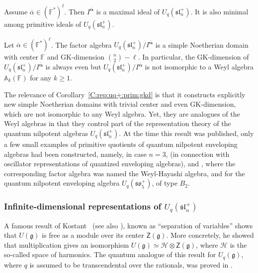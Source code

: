 \documentclass{commat}
\newcommand{\FF}{\mathbb{F}}
\newcommand{\wa}[1][1]{\mathbb{A}_{#1}}
\newcommand\ot{\otimes}
\newcommand{\barr}[1]{\overline{#1}}
\newcommand{\g}{\mathfrak g}
\newcommand{\fsl}{\mathfrak{sl}}
\begin{document}
\begin{theorem}[{\cite[Thm.\ 3.5]{sL06}}]\label{T:rep:uq+:prim:mt}
	Assume $\barr \alpha\in(\FF^{*})^{\ell}$. Then $I^{\mathbf{\barr\alpha}}$ is a maximal ideal of $U_q(\fsl_n^+)$. It is also minimal among primitive ideals of $U_q(\fsl_n^+)$.
\end{theorem}



\begin{corollary}[{\cite[Cor.\ 3.6]{sL06}}]\label{C:rep:uq+:prim:gkd}
	Let $\barr \alpha\in(\FF^{*})^{\ell}$. The factor algebra $U_q(\fsl_n^+)/I^{\mathbf{\barr\alpha}}$ is a simple Noetherian domain with center $\FF$ and GK-dimension $\binom{n}{2}-\ell$. In particular, the GK-dimension of $U_q(\fsl_n^+)/I^{\mathbf{\barr\alpha}}$ is always even but $U_q(\fsl_n^+)/I^{\mathbf{\barr\alpha}}$ is not isomorphic to a Weyl algebra $\wa[k](\FF)$ for any $k\geq 1$.
\end{corollary}

The relevance of Corollary~\ref{C:rep:uq+:prim:gkd} is that it constructs explicitly new simple Noetherian domains with trivial center and even GK-dimension, which are not isomorphic to any Weyl algebra. Yet, they are analogues of the Weyl algebras in that they control part of the representation theory of the quantum nilpotent algebras $U_q(\fsl_n^+)$. At the time this result was published, only a few small examples of primitive quotients of quantum nilpotent enveloping algebras had been constructed, namely, in case $n=3$, \cite{tH90} (in connection with oscillator representations of quantized enveloping algebras), \cite{KS93} and \cite{mpM94}, where the corresponding factor algebra was named the Weyl-Hayashi algebra, and \cite{sL07} for the quantum nilpotent enveloping algebra $U_q(\mathfrak{so}_5^+)$, of type $B_2$.



\subsubsection{Infinite-dimensional representations of \texorpdfstring{$U_q(\fsl_n^+)$}{Uq(sln+)}}\label{SS:rep:uq+:reps}

A famous result of Kostant~\cite{bK63} (see also \cite[8.2.4]{jD96}), known as ``separation of variables'' shows that $U(\g)$ is free as a module over its center $\mathsf{Z}(\g)$. More concretely, he showed that multiplication gives an isomorphism $U(\g)\simeq\mathcal{H}\ot \mathsf{Z}(\g)$, where $\mathcal{H}$ is the so-called space of harmonics. The quantum analogue of this result for $U_q(\g)$, where $q$ is assumed to be transcendental over the rationals, was proved in \cite{JL94}.
\end{document}
